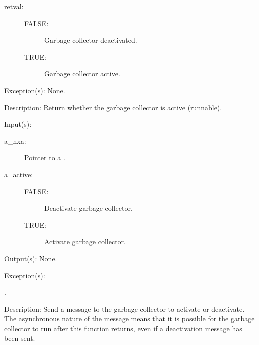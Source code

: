 \begin{capi}
\begin{capilist}
		\begin{description}\item[]
		\item[retval: ]
			\begin{description}\item[]
			\item[FALSE: ]
				Garbage collector deactivated.
			\item[TRUE: ]
				Garbage collector active.
			\end{description}
		\end{description}
	\item[Exception(s): ] None.
	\item[Description: ]
		Return whether the garbage collector is active (runnable).
	\end{capilist}
\label{nxa_active_set}
	\begin{capilist}
	\item[Input(s): ]
		\begin{description}\item[]
		\item[a\_nxa: ]
			Pointer to a .
		\item[a\_active: ]
			\begin{description}\item[]
			\item[FALSE: ]
				Deactivate garbage collector.
			\item[TRUE: ]
				Activate garbage collector.
			\end{description}
		\end{description}
	\item[Output(s): ] None.
	\item[Exception(s): ]
		\begin{description}\item[]
		\item[.]
		\end{description}
	\item[Description: ]
		Send a message to the garbage collector to activate or
		deactivate.  The asynchronous nature of the message means that
		it is possible for the garbage collector to run after this
		function returns, even if a deactivation message has been sent.
	\end{capilist}
\label{nxa_period_get}

\end{capi}
